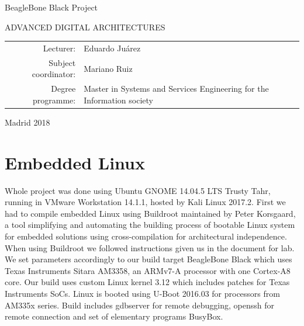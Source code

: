 \documentclass[UKenglish,10pt,a4paper]{report}
\let\openright=\clearpage
\begin{document}
\begin{titlepage}
\begin{center}
\vspace{10mm}

{\LARGE\bfseries } BeagleBone Black Project

\vfill

ADVANCED DIGITAL ARCHITECTURES

\vfill

\begin{tabular}{rl}

Lecturer: & Eduardo Juárez  \\
\noalign{\vspace{2mm}}
Subject coordinator: & Mariano Ruiz \\
\noalign{\vspace{2mm}}
Degree programme: & Master in Systems and Services Engineering for the Information society \\
\end{tabular}

\vfill

Madrid 2018

\end{center}
\end{titlepage}
\newpage



\openright

\noindent






\openright
\pagestyle{plain}
\setcounter{page}{1}
\tableofcontents


\chapter{Embedded Linux}
Whole project was done using Ubuntu GNOME 14.04.5 LTS Trusty Tahr, running in VMware Workstation 14.1.1, hosted by Kali Linux 2017.2. First we had to compile embedded Linux using Buildroot maintained by Peter Korsgaard, a tool simplifying and automating the building process of bootable Linux system for embedded solutions using cross-compilation for architectural independence. When using Buildroot we followed instructions given us in the document for lab. We set parameters accordingly to our build target BeagleBone Black which uses Texas Instruments Sitara AM3358, an ARMv7-A processor with one Cortex-A8  core. Our build uses custom Linux kernel 3.12 which includes patches for Texas Instruments SoCs. Linux is booted using U-Boot 2016.03 for processors from AM335x series. Build includes gdbserver for remote debugging, openssh for remote connection and set of elementary programs BusyBox.
\end{document}
